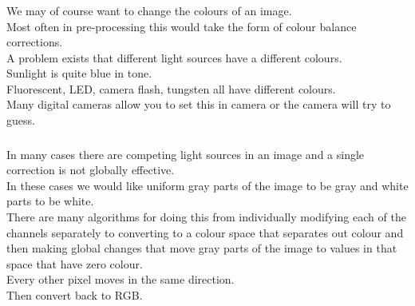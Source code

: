 \begin{frame}\frametitle{}
We may of course want to change the colours of an image.\\
Most often in pre-processing this would take the form of colour balance corrections.\\ A problem exists that different light sources have a different colours.\\
Sunlight is quite blue in tone. \\
Fluorescent, LED, camera flash, tungsten all have different colours. \\
Many digital cameras allow you to set this in camera or the camera will try to guess. \\
\end{frame}
\begin{frame}\frametitle{}
In many cases there are competing light sources in an image and a single correction is not globally effective. \\In these cases we would like uniform gray parts of the image to be gray and white parts to be white. \\
There are many algorithms for doing this from individually modifying each of the channels separately to converting to a colour space that separates out colour and then making global changes that move gray parts of the image to values in that space that have zero colour. \\Every other pixel moves in the same direction. \\
Then convert back to RGB.
\end{frame}

